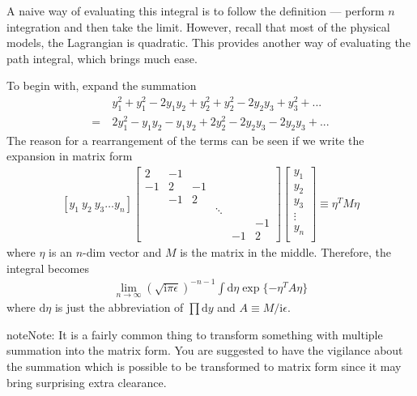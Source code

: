 \documentclass[letterpaper,10pt,english]{sphinxmanual}
\begin{document}
A naive way of evaluating this integral is to follow the definition --- perform \(n\) integration and then take the limit. However, recall that most of the physical models, the Lagrangian is quadratic. This provides another way of evaluating the path integral, which brings much ease.

To begin with, expand the summation
\begin{equation*}
\begin{split}&y_1^2 + y_1^2 - 2y_1y_2 + y_2^2 + y_2^2 - 2y_2 y_3 + y_3^2 + ...\\
=\ &2y_1^2 - y_1y_2 - y_1y_2 + 2y_2^2 - 2y_2 y_3 - 2y_2 y_3 + ...\end{split}
\end{equation*}
The reason for a rearrangement of the terms can be seen if we write the expansion in matrix form
\begin{equation*}
\begin{split}[y_1\ y_2\ y_3 \ldots y_n]
\left[
\begin{matrix}
2 & -1 &  &  & & \\
-1 & 2 & -1 &  & & \\
& -1 & 2 & & & \\
& & & \ddots & & \\
& & & & & -1\\
& & & & -1 & 2
\end{matrix}
\right]
\left[
\begin{matrix}
y_1\\
y_2\\
y_3\\
\vdots\\
y_n\\
\end{matrix}
\right]
\equiv \eta^T M \eta\end{split}
\end{equation*}
where \(\eta\) is an \(n\)-dim vector and \(M\) is the matrix in the middle. Therefore, the integral becomes
\begin{equation*}
\begin{split}\lim_{n\rightarrow\infty}(\sqrt{\mathrm{i}\pi\epsilon})^{-n-1}\int \mathrm{d}\eta\exp\{-\eta^T A \eta\}\end{split}
\end{equation*}
where \(\mathrm d\eta\) is just the abbreviation of \(\prod\mathrm dy\) and \(A\equiv M/\mathrm i\epsilon\).

\begin{sphinxadmonition}{note}{Note:}
It is a fairly common thing to transform something with multiple summation into the matrix form. You are suggested to have the vigilance about the summation which is possible to be transformed to matrix form since it may bring surprising extra clearance.
\end{sphinxadmonition}
\end{document}
